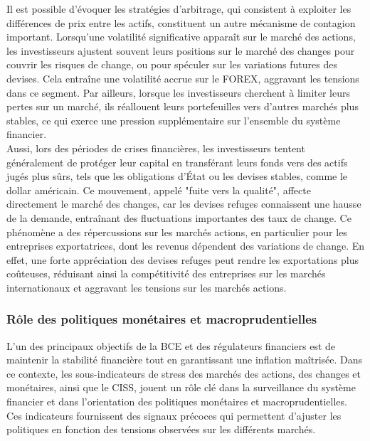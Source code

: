 \begin{sloppypar}
Il est possible d'évoquer les stratégies d'arbitrage, qui consistent à exploiter les différences de prix entre les actifs, constituent un autre mécanisme de contagion important. Lorsqu'une volatilité significative apparaît sur le marché des actions, les investisseurs ajustent souvent leurs positions sur le marché des changes pour couvrir les risques de change, ou pour spéculer sur les variations futures des devises. Cela entraîne une volatilité accrue sur le FOREX, aggravant les tensions dans ce segment. Par ailleurs, lorsque les investisseurs cherchent à limiter leurs pertes sur un marché, ils réallouent leurs portefeuilles vers d'autres marchés plus stables, ce qui exerce une pression supplémentaire sur l'ensemble du système financier.\\

Aussi, lors des périodes de crises financières, les investisseurs tentent généralement de protéger leur capital en transférant leurs fonds vers des actifs jugés plus sûrs, tels que les obligations d'État ou les devises stables, comme le dollar américain. Ce mouvement, appelé "fuite vers la qualité", affecte directement le marché des changes, car les devises refuges connaissent une hausse de la demande, entraînant des fluctuations importantes des taux de change. Ce phénomène a des répercussions sur les marchés actions, en particulier pour les entreprises exportatrices, dont les revenus dépendent des variations de change. En effet, une forte appréciation des devises refuges peut rendre les exportations plus coûteuses, réduisant ainsi la compétitivité des entreprises sur les marchés internationaux et aggravant les tensions sur les marchés actions.

\subsubsection{Rôle des politiques monétaires et macroprudentielles}

L’un des principaux objectifs de la BCE et des régulateurs financiers est de maintenir la stabilité financière tout en garantissant une inflation maîtrisée. Dans ce contexte, les sous-indicateurs de stress des marchés des actions, des changes et monétaires, ainsi que le CISS, jouent un rôle clé dans la surveillance du système financier et dans l'orientation des politiques monétaires et macroprudentielles. Ces indicateurs fournissent des signaux précoces qui permettent d’ajuster les politiques en fonction des tensions observées sur les différents marchés.\\


\end{sloppypar}
